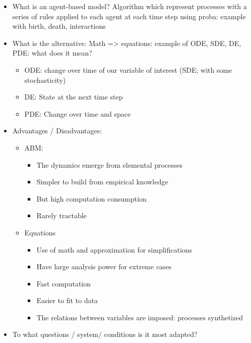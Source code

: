 \documentclass[
]{book}
\providecommand{\tightlist}{%
  \setlength{\itemsep}{0pt}\setlength{\parskip}{0pt}}
\theoremstyle{definition}
\theoremstyle{definition}
\theoremstyle{definition}
\theoremstyle{definition}
\theoremstyle{remark}
\begin{document}
\begin{itemize}
\tightlist
\item
  What is an agent-based model? Algorithm which represent processes with a series of rules applied to each agent at each time step using proba: example with birth, death, interactions
\item
  What is the alternative: Math =\textgreater{} equations: example of ODE, SDE, DE, PDE: what does it mean?

  \begin{itemize}
  \tightlist
  \item
    ODE: change over time of our variable of interest (SDE; with some stochasticity)
  \item
    DE: State at the next time step
  \item
    PDE: Change over time and space
  \end{itemize}
\item
  Advantages / Disadvantages:

  \begin{itemize}
  \tightlist
  \item
    ABM:

    \begin{itemize}
    \tightlist
    \item
      The dynamics emerge from elemental processes
    \item
      Simpler to build from empirical knowledge
    \item
      But high computation consumption
    \item
      Rarely tractable
    \end{itemize}
  \item
    Equations

    \begin{itemize}
    \tightlist
    \item
      Use of math and approximation for simplifications
    \item
      Have large analysis power for extreme cases
    \item
      Fast computation
    \item
      Easier to fit to data
    \item
      The relations between variables are imposed: processes synthetized
    \end{itemize}
  \end{itemize}
\item
  To what questions / system/ conditions is it most adapted?


\end{itemize}
\end{document}

